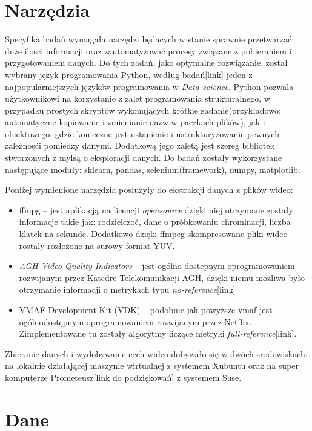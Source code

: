 \section{Narzędzia}
Specyfika badań wymagała narzędzi będących w stanie sprawnie przetwarzać duże ilosci informacji oraz zautomatyzować procesy związane z pobieraniem i przygotowaniem danych. Do tych zadań, jako optymalne rozwiązanie, został wybrany język programowania Python, według badań[link] jeden z najpopularniejszych języków programowania w {\em Data science}. Python pozwala użytkownikowi na korzystanie z zalet programowania strukturalnego, w przypadku prostych skryptów wykonujących krótkie zadanie(przykładowo: automatyczne kopiowanie i zmienianie nazw w paczkach plików), jak i obiektowego, gdzie konieczne jest ustanienie i ustrukturyzowanie pewnych zależnosći pomiedzy danymi. Dodatkową jego zaletą jest szereg bibliotek stworzonych z mylsą o eksploracji danych. Do badań zostały wykorzystane następujące moduły: sklearn, pandas, selenium(framework), numpy, matplotlib.\par
Poniżej wymienione narzędzia posłużyły do ekstrakcji danych z plików wideo:
\begin{itemize}[label=$\bullet$]
\item ffmpg -- jest aplikacją na licencji {\em opensource} dzięki niej otrzymane zostały informacje takie jak: rodzielczoć, dane o próbkowaniu chrominacji, liczba klatek na sekunde. Dodatkowo dzięki ffmpeg skompresowane pliki wideo rostaly rozłożone na surowy format YUV.
\item {\em AGH Video Quality Indicators} --  jest ogólno dostepnym oprogramowaniem rozwijanym przez Katedre Telekomunikacji AGH, dzięki niemu możliwa było otrzymanie informacji o metrykach typu {\em no-reference}[link]
\item VMAF Development Kit (VDK) -- podobnie jak powyższe vmaf  jest ogólnodostępnym oprogramowaniem rozwijanym przez Netflix. Zimplementowane tu zostały algorytmy liczące metryki {\em full-reference}[link].
\end{itemize}
Zbieranie danych i wydobywanie cech wideo dobywało się w dwóch srodowiskach: na lokalnie działającej maszynie wirtualnej z systemem Xubuntu oraz na super komputerze Prometeusz[link do podziękowań] z systemem Suse. 

\label{cha:drugiDokument}



\section{Dane}
\label{cha:drugiDokument}

